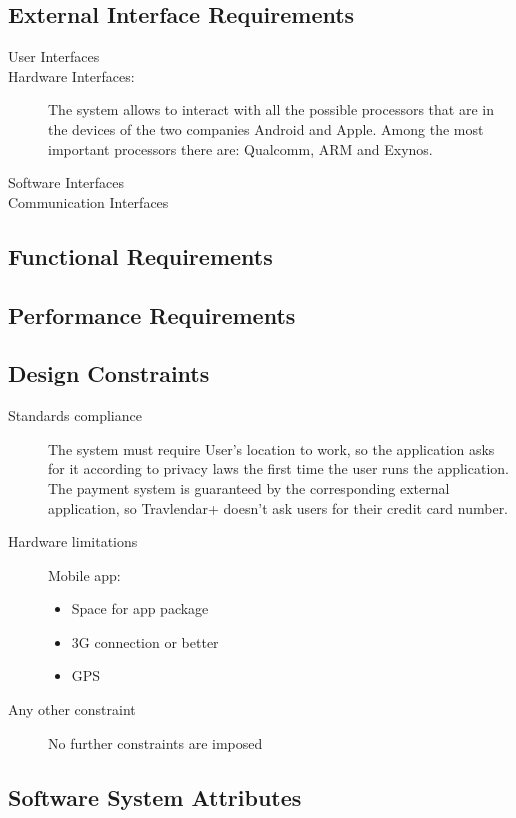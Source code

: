 \subsection{External Interface Requirements}
				\begin{description}
					\item[User Interfaces]
					\item[Hardware Interfaces:] The system allows to interact with all the possible processors that are in the devices of the two companies Android and Apple. Among the most important processors there are: Qualcomm, ARM and Exynos.

					\item[Software Interfaces]
					\item[Communication Interfaces]
				\end{description}

\subsection{Functional Requirements}
	
			
\subsection{Performance Requirements}
		
		
\subsection{Design Constraints}
		\begin{description}
			\item[Standards compliance]
			The system must require User’s location to work, so the application asks for it according to privacy laws the first time the user runs the application.
			The payment system is guaranteed by the corresponding external application, so Travlendar+ doesn’t ask users for their credit card number.

			\item[Hardware limitations]
			Mobile app:
			\begin{itemize}
			\item Space for app package
			\item 3G connection or better
			\item GPS
		\end{itemize}

			\item[Any other constraint]
			No further constraints are imposed
\end{description}
		
\subsection{Software System Attributes}
	
